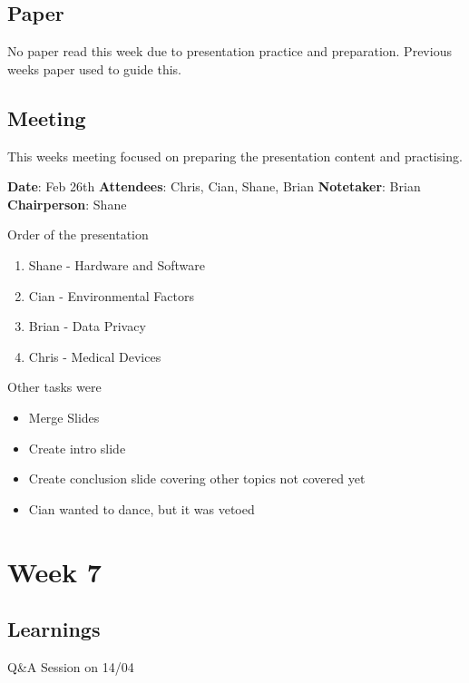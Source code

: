 \section{Paper}

No paper read this week due to presentation practice and preparation. Previous weeks paper used to guide this.

\section{Meeting}

This weeks meeting focused on preparing the presentation content and practising.

\textbf{Date}: Feb 26th\newline
\textbf{Attendees}: Chris, Cian, Shane, Brian\newline
\textbf{Notetaker}: Brian\newline
\textbf{Chairperson}: Shane\newline \newline

Order of the presentation
\begin{enumerate}
\item Shane - Hardware and Software
\item Cian - Environmental Factors
\item Brian - Data Privacy
\item Chris - Medical Devices
\end{enumerate}

Other tasks were

\begin{itemize}
\item Merge Slides
\item Create intro slide
\item Create conclusion slide covering other topics not covered yet
\item Cian wanted to dance, but it was vetoed
\end{itemize}

\chapter{Week 7}

\section{Learnings}

Q\&A Session on 14/04

